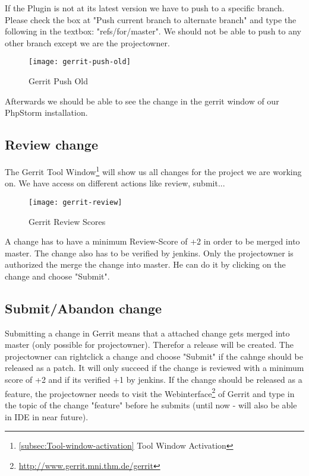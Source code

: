 If the Plugin is not at its latest version we have to push to a specific branch. Please check the box at "Push current branch to alternate branch" and type the following in the textbox: "refs/for/master". We should not be able to push to any other branch except we are the projectowner. 

\begin{figure}[H] 
	\centering
	\vspace{3pt}
	\texttt{[image: gerrit-push-old]}
	\caption{Gerrit Push Old}
\end{figure}

Afterwards we should be able to see the change in the gerrit window of our PhpStorm installation.

\subsection{Review change}
The Gerrit Tool Window\footnote{\ref{subsec:Tool-window-activation} Tool Window Activation} will show us all changes for the project we are working on. We have access on different actions like review, submit...

\begin{figure}[H] 
	\centering
	\vspace{3pt}
	\texttt{[image: gerrit-review]}
	\caption{Gerrit Review Scores}
\end{figure}

A change has to have a minimum Review-Score of +2 in order to be merged into master. The change also has to be verified by jenkins. Only the projectowner is authorized the merge the change into master. He can do it by clicking on the change and choose "Submit".

\subsection{Submit/Abandon change}
Submitting a change in Gerrit means that a attached change gets merged into master (only possible for projectowner). Therefor a release will be created. The projectowner can  rightclick a change and choose "Submit" if the cahnge should be released as a patch. It will only succeed if the change is reviewed with a minimum score of +2 and if its verified +1 by jenkins. If the change should be released as a feature, the projectowner needs to visit the Webinterface\footnote{\url{http://www.gerrit.mni.thm.de/gerrit}} of Gerrit and type in the topic of the change "feature" before he submits (until now - will also be able in IDE in near future). 

